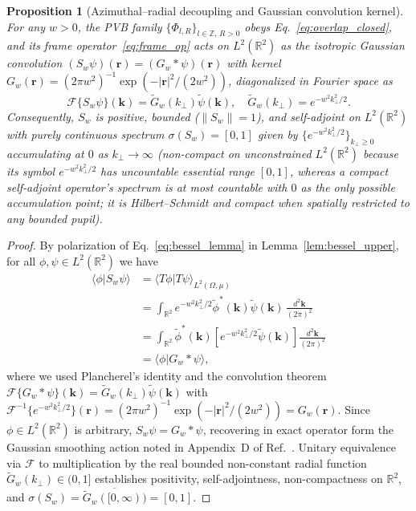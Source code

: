 \documentclass[aps,pra,reprint,nofootinbib,floatfix,longbibliography]{revtex4-2}
\newtheorem{proposition}{Proposition}
\theoremstyle{remark}
\newcommand{\braket}[2]{\langle #1 | #2 \rangle}
\newcommand{\norm}[1]{\lVert #1 \rVert}
\newcommand{\abs}[1]{\lvert #1 \rvert}
\begin{document}
\begin{proposition}[Azimuthal--radial decoupling and Gaussian convolution kernel]
\label{prop:conv_kernel}
For any $w > 0$, the PVB family $\{\Phi_{l,R}\}_{l\in\mathbb{Z},\,R>0}$ obeys Eq.~\eqref{eq:overlap_closed}, and its frame operator~\eqref{eq:frame_op} acts on $L^2(\mathbb{R}^2)$ as the isotropic Gaussian convolution $(S_w\psi)(\mathbf{r}) = (G_w * \psi)(\mathbf{r})$ with kernel $G_w(\mathbf{r}) = (2\pi w^2)^{-1}\exp(-\abs{\mathbf{r}}^2/(2w^2))$, diagonalized in Fourier space as
\begin{equation}
\mathcal{F}\{S_w\psi\}(\mathbf{k}) = \widetilde{G}_w(k_\perp)\widetilde{\psi}(\mathbf{k}), \quad \widetilde{G}_w(k_\perp) = e^{-w^2 k_\perp^2/2}.
\label{eq:fourier_diag}
\end{equation}
Consequently, $S_w$ is positive, bounded ($\norm{S_w} = 1$), and self-adjoint on $L^2(\mathbb{R}^2)$ with purely continuous spectrum $\sigma(S_w) = [0,1]$ given by $\{e^{-w^2 k_\perp^2/2}\}_{k_\perp \ge 0}$ accumulating at $0$ as $k_\perp \to \infty$ (non-compact on unconstrained $L^2(\mathbb{R}^2)$ because its symbol $e^{-w^2 k_\perp^2/2}$ has uncountable essential range $[0,1]$, whereas a compact self-adjoint operator's spectrum is at most countable with $0$ as the only possible accumulation point; it is Hilbert--Schmidt and compact when spatially restricted to any bounded pupil).
\end{proposition}
\begin{proof}
By polarization of Eq.~\eqref{eq:bessel_lemma} in Lemma~\ref{lem:bessel_upper}, for all $\phi,\psi \in L^2(\mathbb{R}^2)$ we have
\begin{align}
\braket{\phi}{S_w\psi} &= \braket{T\phi}{T\psi}_{L^2(\Omega,\mu)} \nonumber \\
&= \int_{\mathbb{R}^2} e^{-w^2 k_\perp^2/2}\widetilde{\phi}^*(\mathbf{k})\widetilde{\psi}(\mathbf{k})\,\frac{d^2\mathbf{k}}{(2\pi)^2} \nonumber \\
&= \int_{\mathbb{R}^2} \widetilde{\phi}^*(\mathbf{k})\!\left[e^{-w^2 k_\perp^2/2}\widetilde{\psi}(\mathbf{k})\right]\frac{d^2\mathbf{k}}{(2\pi)^2} \nonumber \\
&= \braket{\phi}{G_w * \psi},
\label{eq:prop1_polarization}
\end{align}
where we used Plancherel's identity and the convolution theorem $\mathcal{F}\{G_w * \psi\}(\mathbf{k}) = \widetilde{G}_w(k_\perp)\widetilde{\psi}(\mathbf{k})$ with $\mathcal{F}^{-1}\{e^{-w^2 k_\perp^2/2}\}(\mathbf{r}) = (2\pi w^2)^{-1}\exp(-\abs{\mathbf{r}}^2/(2w^2)) = G_w(\mathbf{r})$. Since $\phi \in L^2(\mathbb{R}^2)$ is arbitrary, $S_w\psi = G_w * \psi$, recovering in exact operator form the Gaussian smoothing action noted in Appendix~D of Ref.~\cite{Ferreira2026}. Unitary equivalence via $\mathcal{F}$ to multiplication by the real bounded non-constant radial function $\widetilde{G}_w(k_\perp) \in (0,1]$ establishes positivity, self-adjointness, non-compactness on $\mathbb{R}^2$, and $\sigma(S_w) = \overline{\widetilde{G}_w([0,\infty))} = [0,1]$.
\end{proof}
\end{document}
